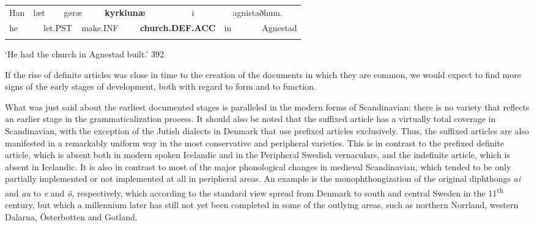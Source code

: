 \begin{tabular}{llllllllllll}
\lsptoprule
Han & \multicolumn{2}{l}{læt

} & \multicolumn{2}{l}{gøræ

} & \multicolumn{2}{l}{{\bfseries kyrkiunæ}

} & \multicolumn{2}{l}{i

} & \multicolumn{2}{l}{agnistaðhum.

} & \\
\multicolumn{2}{l}{he

} & \multicolumn{2}{l}{let.PST

} & \multicolumn{2}{l}{make.INF

} & \multicolumn{2}{l}{{\bfseries church.DEF.ACC}

} & \multicolumn{2}{l}{in

} & \multicolumn{2}{l}{Agnestad

}\\
\lspbottomrule
\end{tabular}

\begin{styleTranslation}
‘He had the church in Agnestad built.’ 392

\end{styleTranslation}

\begin{styleBodytextC}
If the rise of definite articles was close in time to the creation of the documents in which they are common, we would expect to find more signs of the early stages of development, both with regard to form and to function.

\end{styleBodytextC}

\begin{styleBodytextC}
What was just said about the earliest documented stages is paralleled in the modern forms of Scandinavian: there is no variety that reflects an earlier stage in the grammaticalization process. It should also be noted that the suffixed article has a virtually total coverage in Scandinavian, with the exception of the Jutish dialects in Denmark that use prefixed articles exclusively. Thus, the suffixed articles are also manifested in a remarkably uniform way in the most conservative and peripheral varieties. This is in contrast to the prefixed definite article, which is absent both in modern spoken Icelandic and in the Peripheral Swedish vernaculars, and the indefinite article, which is absent in Icelandic. It is also in contrast to most of the major phonological changes in medieval Scandinavian, which tended to be only partially implemented or not implemented at all in peripheral areas. An example is the monophthongization of the original diphthongs \textit{ai} and \textit{au }to\textit{ e }and\textit{ ö,} respectively, which according to the standard view spread from Denmark to south and central Sweden in the 11\textsuperscript{th} century, but which a millennium later has still not yet been completed in some of the outlying areas, such as northern Norrland, western Dalarna, Österbotten and Gotland.  

\end{styleBodytextC}

